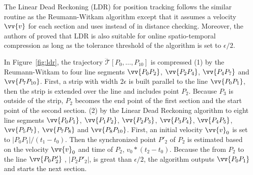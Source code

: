 {{The Linear Dead Reckoning (LDR)\cite{Lange:Tracking} for position tracking follows the similar routine as the Reumann-Witkam algorithm except that it assumes a velocity ${\vv{v}}$ for each section and uses \sed instead of \ped in distance checking.
Moreover, the authors of \cite{Trajcevski:DDR} proved that LDR is also suitable for online spatio-temporal compression as long as the tolerance threshold of the algorithm is set to $\epsilon/2$.}

\begin{example}
\label{exm-alg-strip}
In Figure~\ref{fig:ldr}, the trajectory $\dddot{\mathcal{T}}[P_0, \ldots, P_{10}]$ is compressed
%
(1) by the Reumann-Witkam to four line segments $\vv{P_0P_2}$, $\vv{P_2P_4}$, $\vv{P_4P_7}$ and $\vv{P_7P_{10}}$. First, a strip with width $2\epsilon$ is built parallel to the line $\vv{P_0P_1}$, then the strip is extended over the line and includes point $P_2$. Because $P_3$ is outside of the strip, $P_2$ becomes the end point of the first section and the start point of the second section.
%
(2) by the Linear Dead Reckoning algorithm to eight line segments $\vv{P_0P_1}$, $\vv{P_1P_2}$, $\vv{P_2P_3}$, $\vv{P_3P_4}$, $\vv{P_4P_5}$, $\vv{P_5P_7}$, $\vv{P_7P_8}$ and $\vv{P_8P_{10}}$. First, an initial velocity ${\vv{v}_0}$ is set to $|P_0P_1|/(t_1-t_0)$. Then the synchronized point $P'_2$ of $P_2$ is estimated based on the velocity ${\vv{v}_0}$ and time of $P_2$, \ie ${v}_0 * (t_2-t_0)$. Because the \sed from $P_2$ to the line $\vv{P_0P'_2}$ , \ie $|P_2P'_2|$, is great than $\epsilon/2$, the algorithm outputs $\vv{P_0P_1}$ and starts the next section.
\end{example}

}%

